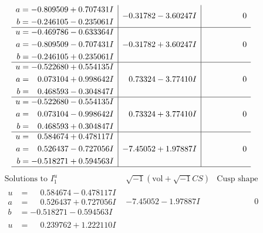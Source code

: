 \documentclass[1p]{elsarticle_modified}
\theoremstyle{definition}
\newcommand{\I}{\sqrt{-1}}
\begin{document}
$$\begin{array}{c|c|c}
\begin{aligned}
a &= -0.809509 + 0.707431 I \\
b &= -0.246105 - 0.235061 I\end{aligned}
 & -0.31782 - 3.60247 I & \phantom{-0.000000 } 0 \\ \hline\begin{aligned}
u &= -0.469786 - 0.633364 I \\
a &= -0.809509 - 0.707431 I \\
b &= -0.246105 + 0.235061 I\end{aligned}
 & -0.31782 + 3.60247 I & \phantom{-0.000000 } 0 \\ \hline\begin{aligned}
u &= -0.522680 + 0.554135 I \\
a &= \phantom{-}0.073104 + 0.998642 I \\
b &= \phantom{-}0.468593 - 0.304847 I\end{aligned}
 & \phantom{-}0.73324 - 3.77410 I & \phantom{-0.000000 } 0 \\ \hline\begin{aligned}
u &= -0.522680 - 0.554135 I \\
a &= \phantom{-}0.073104 - 0.998642 I \\
b &= \phantom{-}0.468593 + 0.304847 I\end{aligned}
 & \phantom{-}0.73324 + 3.77410 I & \phantom{-0.000000 } 0 \\ \hline\begin{aligned}
u &= \phantom{-}0.584674 + 0.478117 I \\
a &= \phantom{-}0.526437 - 0.727056 I \\
b &= -0.518271 + 0.594563 I\end{aligned}
 & -7.45052 + 1.97887 I & \phantom{-0.000000 } 0\\
 \hline 
 \end{array}$$\newpage$$\begin{array}{c|c|c}  
\text{Solutions to }I^u_{1}& \I (\text{vol} + \sqrt{-1}CS) & \text{Cusp shape}\\
 \hline 
\begin{aligned}
u &= \phantom{-}0.584674 - 0.478117 I \\
a &= \phantom{-}0.526437 + 0.727056 I \\
b &= -0.518271 - 0.594563 I\end{aligned}
 & -7.45052 - 1.97887 I & \phantom{-0.000000 } 0 \\ \hline\begin{aligned}
u &= \phantom{-}0.239762 + 1.222110 I \\

\end{aligned}
\end{array}$$
\end{document}
